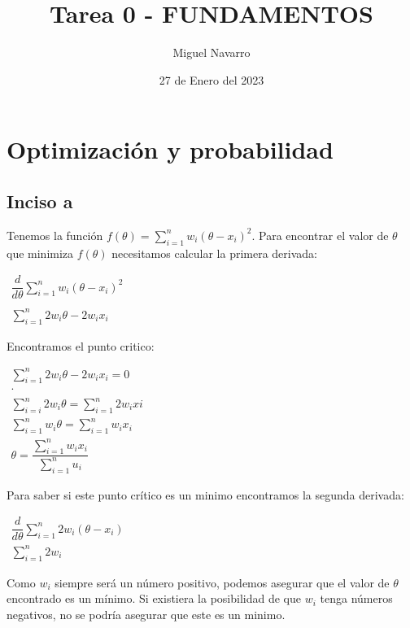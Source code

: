 \documentclass[11pt]{article}
\title{ Tarea 0 - FUNDAMENTOS}
\author{ Miguel Navarro }
\date{27 de Enero del 2023}
\begin{document}
\maketitle	


\section{Optimización y probabilidad}
\subsection{Inciso a}
Tenemos la función $f\left( \theta \right) =\sum ^{n}_{i=1}w_{i}\left( \theta -x_{i}\right) ^{2}$. Para encontrar el valor de $\theta$ que minimiza $f\left( \theta \right)$ necesitamos calcular la primera derivada:\\
\begin{center}
$\begin{aligned}\dfrac{d}{d\theta }\sum ^{n}_{i=1}w_{i}\left( \theta -x_{i}\right) ^{2}\\ \end{aligned}$\\
$\begin{aligned}\sum ^{n}_{i=1}2w_{i}\theta -2w_{i}x_{i}\end{aligned}$\\
\end{center}
Encontramos el punto critico:
\begin{center}
$\begin{aligned}\sum ^{n}_{i=1}2w_{i}\theta -2w_{i}x_{i}=0\end{aligned}$\\
$\begin{aligned}\cdot \\ \sum ^{n}_{i=i}2w_{i}\theta =\sum ^{n}_{i=1}2w_{i}xi\end{aligned}$\\
$\begin{aligned}\sum ^{n}_{i=1}w_{i}\theta =\sum ^{n}_{i=1}w_{i}x_{i}\end{aligned}$\\
$\begin{aligned}\theta =\dfrac{\sum ^{n}_{i=1}w_{i}x_{i}}{\sum ^{n}_{i=1}u_{i}}\end{aligned}$
\end{center}
Para saber si este punto crítico es un minimo encontramos la segunda derivada:
\begin{center}
$\begin{aligned}\dfrac{d}{d\theta }\sum ^{n}_{i=1}2w_{i}\left( \theta -x_{i}\right)\end{aligned}$\\
$\begin{aligned}\sum ^{n}_{i=1}2w_{i}\end{aligned}$\\
\end{center}
Como $w_{i}$ siempre será un número positivo, podemos asegurar que el valor de $\theta$ encontrado es un mínimo. Si existiera la posibilidad de que $w_{i}$ tenga números negativos, no se podría asegurar que este es un minimo.
\pagebreak
\end{document}
